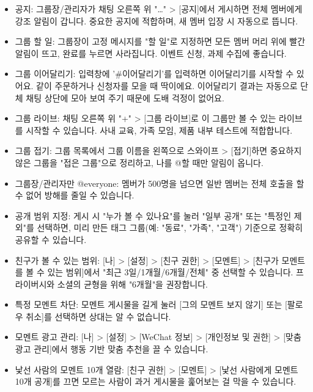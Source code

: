 \begin{itemize}
  \item 공지: 그룹장/관리자가 채팅 오른쪽 위 "…" > [공지]에서 게시하면 전체 멤버에게 강조 알림이 갑니다. 중요한 공지에 적합하며, 새 멤버 입장 시 자동으로 뜹니다.
  \item 그룹 할 일: 그룹장이 고정 메시지를 "할 일"로 지정하면 모든 멤버 머리 위에 빨간 알림이 뜨고, 완료를 누르면 사라집니다. 이벤트 신청, 과제 수집에 좋습니다.
  \item 그룹 이어달리기: 입력창에 '\#이어달리기'를 입력하면 이어달리기를 시작할 수 있어요. 같이 주문하거나 신청자를 모을 때 딱이에요. 이어달리기 결과는 자동으로 단체 채팅 상단에 모아 보여 주기 때문에 도배 걱정이 없어요.
  \item 그룹 라이브: 채팅 오른쪽 위 "+" > [그룹 라이브]로 이 그룹만 볼 수 있는 라이브를 시작할 수 있습니다. 사내 교육, 가족 모임, 제품 내부 테스트에 적합합니다.
  \item 그룹 접기: 그룹 목록에서 그룹 이름을 왼쪽으로 스와이프 > [접기]하면 중요하지 않은 그룹을 "접은 그룹"으로 정리하고, 나를 @할 때만 알림이 옵니다.
  \item 그룹장/관리자만 @everyone: 멤버가 500명을 넘으면 일반 멤버는 전체 호출을 할 수 없어 방해를 줄일 수 있습니다.
\end{itemize}


\begin{itemize}
  \item 공개 범위 지정: 게시 시 "누가 볼 수 있나요"를 눌러 "일부 공개" 또는 "특정인 제외"를 선택하면, 미리 만든 태그 그룹(예: "동료", "가족", "고객") 기준으로 정확히 공유할 수 있습니다.
  \item 친구가 볼 수 있는 범위: [나] > [설정] > [친구 권한] > [모멘트] > [친구가 모멘트를 볼 수 있는 범위]에서 "최근 3일/1개월/6개월/전체" 중 선택할 수 있습니다. 프라이버시와 소셜의 균형을 위해 "6개월"을 권장합니다.
  \item 특정 모멘트 차단: 모멘트 게시물을 길게 눌러 [그의 모멘트 보지 않기] 또는 [팔로우 취소]를 선택하면 상대는 알 수 없습니다.
  \item 모멘트 광고 관리: [나] > [설정] > [WeChat 정보] > [개인정보 및 권한] > [맞춤 광고 관리]에서 행동 기반 맞춤 추천을 끌 수 있습니다.
  \item 낯선 사람의 모멘트 10개 열람: [친구 권한] > [모멘트] > [낯선 사람에게 모멘트 10개 공개]를 끄면 모르는 사람이 과거 게시물을 훑어보는 걸 막을 수 있습니다.
\end{itemize}

